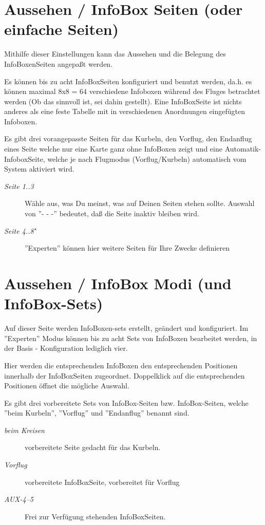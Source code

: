 \section{Aussehen / InfoBox Seiten (oder einfache Seiten)}

Mithilfe dieser Einstellungen kann das Aussehen und die Belegung des InfoBoxenSeiten angepaßt werden.

Es können bis zu acht InfoBoxSeiten konfiguriert und benutzt werden, da.h. es können maximal
8x8 = 64 verschiedene Infoboxen während des Fluges betrachtet werden (Ob das sinnvoll ist, sei dahin gestellt).
Eine InfoBoxSeite ist nichts anderes als eine feste Tabelle mit in verschiedenen Anordnungen eingefügten Infoboxen.

Es gibt drei vorangepasste Seiten für das Kurbeln, den Vorflug, den Endanflug eines Seite welche
nur eine Karte ganz ohne InfoBoxen zeigt und eine Automatik- InfoboxSeite, welche je nach Flugmodus
(Vorflug/Kurbeln) automatisch vom System aktiviert wird.

\begin{description}
\item[\textit{Seite  1..3}] Wähle aus, was Du meinst, was auf Deinen Seiten stehen sollte.
       Auswahl von  ''- - -'' bedeutet, daß die Seite inaktiv bleiben wird.
\item[\textit{Seite 4..8$^{\textcolor{blue}{\star}}$}]  ''Experten'' können hier weitere Seiten für Ihre Zwecke definieren
\end{description}




\section{Aussehen / InfoBox Modi (und InfoBox-Sets)}\label{sec:infobox_sets}

Auf dieser Seite werden InfoBoxen-sets erstellt, geändert und konfiguriert.
Im ''Experten'' Modus können bis zu acht Sets von InfoBoxen bearbeitet werden,
in der Basis - Konfiguration lediglich vier.

Hier werden die entsprechenden InfoBoxen den entsprechenden Positionen innerhalb
der InfoBoxSeiten zugeordnet. Doppelklick auf die entsprechenden Positionen öffnet die mögliche Auswahl.

Es gibt drei vorbereitete Sets von InfoBox-Seiten
bzw. InfoBox-Seiten, welche ''beim Kurbeln'', ''Vorflug'' und ''Endanflug'' benannt sind.

\begin{description}
\item[\textit{beim Kreisen}]  vorbereitete Seite gedacht für das Kurbeln.\\
\item[\textit{Vorflug}] vorbereitete InfoBoxSeite, vorbereitet für Vorflug\\
\item[\textit{AUX-4--5}]Frei zur Verfügung stehenden InfoBoxSeiten.
\end{description}

